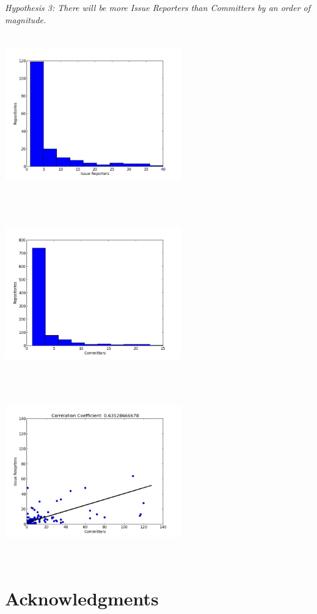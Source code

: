 \documentclass{proc}
\begin{document}
\emph{Hypothesis 3: There will be more Issue Reporters than Committers by an order of magnitude.}\\
\includegraphics[height=3in,width=3in]{images/issue_reporters_histogram.png}
\includegraphics[height=3in,width=3in]{images/committers_histogram.png}
\includegraphics[height=3in,width=3in]{images/issue_reporters_committers_scatterplot.png}

\section{Acknowledgments}


  


\end{document}
